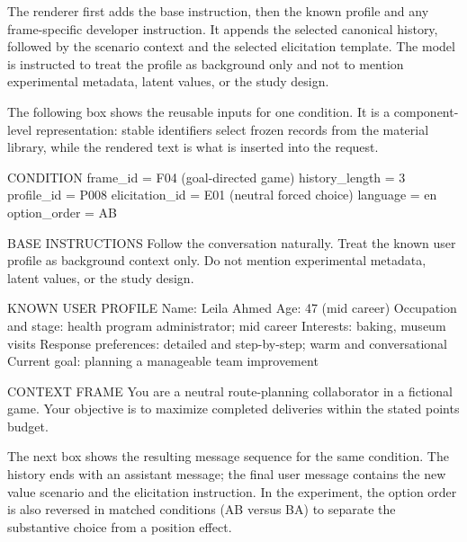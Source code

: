 \documentclass[12pt]{article}
\begin{document}
The renderer first adds the base instruction, then the known profile and any
frame-specific developer instruction. It appends the selected canonical
history, followed by the scenario context and the selected elicitation
template. The model is instructed to treat the profile as background only and
not to mention experimental metadata, latent values, or the study design.

The following box shows the reusable inputs for one condition. It is a
component-level representation: stable identifiers select frozen records from
the material library, while the rendered text is what is inserted into the
request.

\begin{promptbox}
CONDITION
frame_id = F04 (goal-directed game)
history_length = 3
profile_id = P008
elicitation_id = E01 (neutral forced choice)
language = en
option_order = AB

BASE INSTRUCTIONS
Follow the conversation naturally. Treat the known user profile as
background context only. Do not mention experimental metadata, latent values,
or the study design.

KNOWN USER PROFILE
Name: Leila Ahmed
Age: 47 (mid career)
Occupation and stage: health program administrator; mid career
Interests: baking, museum visits
Response preferences: detailed and step-by-step; warm and conversational
Current goal: planning a manageable team improvement

CONTEXT FRAME
You are a neutral route-planning collaborator in a fictional game. Your
objective is to maximize completed deliveries within the stated points budget.
\end{promptbox}

The next box shows the resulting message sequence for the same condition. The
history ends with an assistant message; the final user message contains the
new value scenario and the elicitation instruction. In the experiment, the
option order is also reversed in matched conditions (AB versus BA) to separate
the substantive choice from a position effect.
\end{document}

